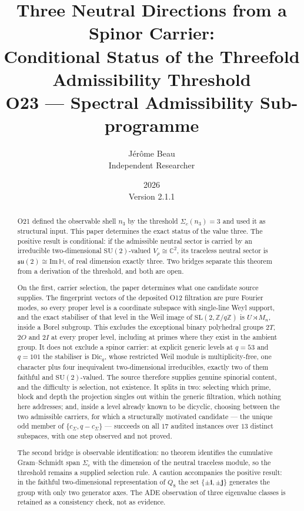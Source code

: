 \documentclass[11pt,a4paper]{article}
\title{Three Neutral Directions from a Spinor Carrier:\\
Conditional Status of the Threefold Admissibility Threshold\\
\large O23 --- Spectral Admissibility Sub-programme}
\author{J\'{e}r\^{o}me Beau\\
\small Independent Researcher}
\date{2026\\[2pt]\small Version 2.1.1}
\newcommand{\ImH}{\mathrm{Im}\,\mathbb{H}}
\newcommand{\su}{\mathfrak{su}}
\newcommand{\SU}{\mathrm{SU}}
\newcommand{\SL}{\mathrm{SL}}
\begin{document}
  \maketitle

  \begin{abstract}
    O21 defined the observable shell $n_{3}$ by the threshold $\Sigma_{c}(n_{3}) = 3$ and used it
    as structural input.
    This paper determines the exact status of the value three.
    The positive result is conditional: if the admissible neutral sector is carried by an
    irreducible two-dimensional $\SU(2)$-valued $V_{\rho} \cong \mathbb{C}^{2}$, its traceless
    neutral sector is $\su(2) \cong \ImH$, of real dimension exactly three.
    Two bridges separate this theorem from a derivation of the threshold, and both are open.

    On the first, carrier selection, the paper determines what one candidate source supplies.
    The fingerprint vectors of the deposited O12 filtration are pure Fourier modes, so every
    proper level is a coordinate subspace with single-line Weyl support, and the exact stabiliser
    of that level in the Weil image of $\SL(2,\mathbb{Z}/q\mathbb{Z})$ is $U \rtimes M_{n}$,
    inside a Borel subgroup.
    This excludes the exceptional binary polyhedral groups $2T$, $2O$ and $2I$ at every proper
    level, including at primes where they exist in the ambient group.
    It does not exclude a spinor carrier: at explicit generic levels at $q = 53$ and $q = 101$
    the stabiliser is $\mathrm{Dic}_{q}$, whose restricted Weil module is multiplicity-free, one
    character plus four inequivalent two-dimensional irreducibles, exactly two of them faithful
    and $\SU(2)$-valued.
    The source therefore supplies genuine spinorial content, and the difficulty is selection, not
    existence.
    It splits in two: selecting which prime, block and depth the projection singles out within
    the generic filtration, which nothing here addresses; and, inside a level already known to be
    dicyclic, choosing between the two admissible carriers, for which a structurally motivated
    candidate --- the unique odd member of $\{c_{\Sigma}, q - c_{\Sigma}\}$ --- succeeds on all
    $17$ audited instances over $13$ distinct subspaces, with one step observed and not proved.

    The second bridge is observable identification: no theorem identifies the cumulative
    Gram--Schmidt span $\Sigma_{c}$ with the dimension of the neutral traceless module, so the
    threshold remains a supplied selection rule.
    A caution accompanies the positive result: in the faithful two-dimensional representation of
    $Q_{8}$ the set $\{\pm\mathbf{i}, \pm\mathbf{j}\}$ generates the group with only two
    generator axes.
    The ADE observation of three eigenvalue classes is retained as a consistency check, not as
    evidence.
  \end{abstract}
\end{document}
